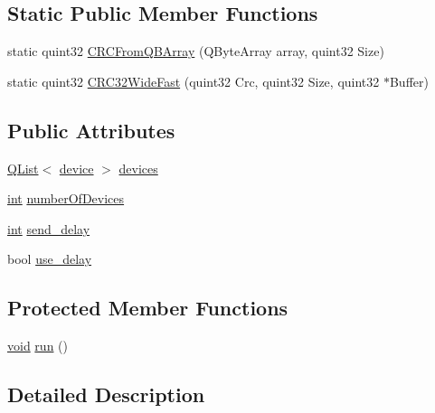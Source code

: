 \subsection*{Static Public Member Functions}
\begin{DoxyCompactItemize}
\item 
static quint32 \hyperlink{group___uploader_ga8b3213586813e0e852bd8e8460f02fc0}{C\-R\-C\-From\-Q\-B\-Array} (Q\-Byte\-Array array, quint32 Size)
\item 
static quint32 \hyperlink{group___uploader_gae755106568ea0611498e45e43bfa9e4d}{C\-R\-C32\-Wide\-Fast} (quint32 Crc, quint32 Size, quint32 $\ast$Buffer)
\end{DoxyCompactItemize}
\subsection*{Public Attributes}
\begin{DoxyCompactItemize}
\item 
\hyperlink{class_q_list}{Q\-List}$<$ \hyperlink{struct_o_p___d_f_u_1_1device}{device} $>$ \hyperlink{class_o_p___d_f_u_1_1_d_f_u_object_ae14ca1c854c2c8378f1c6f0e7c504732}{devices}
\item 
\hyperlink{ioapi_8h_a787fa3cf048117ba7123753c1e74fcd6}{int} \hyperlink{class_o_p___d_f_u_1_1_d_f_u_object_a805f4ba165cc9592522fbc928d06c08d}{number\-Of\-Devices}
\item 
\hyperlink{ioapi_8h_a787fa3cf048117ba7123753c1e74fcd6}{int} \hyperlink{class_o_p___d_f_u_1_1_d_f_u_object_a0a420df742f4528dde9d22a28526a8f3}{send\-\_\-delay}
\item 
bool \hyperlink{class_o_p___d_f_u_1_1_d_f_u_object_a5e6ad3fb431eb0220a06c934b13ae276}{use\-\_\-delay}
\end{DoxyCompactItemize}
\subsection*{Protected Member Functions}
\begin{DoxyCompactItemize}
\item 
\hyperlink{group___u_a_v_objects_plugin_ga444cf2ff3f0ecbe028adce838d373f5c}{void} \hyperlink{group___uploader_gadb19927303aa24b5505dce3adbb532a2}{run} ()
\end{DoxyCompactItemize}


\subsection{Detailed Description}


